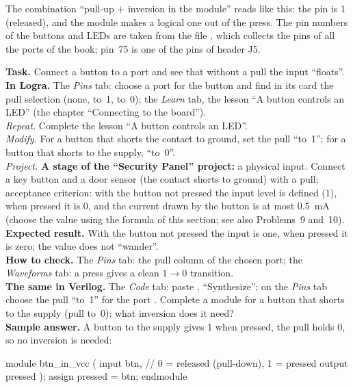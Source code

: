 The combination ``pull-up $+$ inversion in the module'' reads like this: the pin
is 1 (released), and the module makes a logical one out of the press. The pin
numbers of the buttons and LEDs are taken from the file
, which collects the pins of all the ports of
the book; pin~75 is one of the pins of header J5.

\begin{diybox}
\textbf{Task.} Connect a button to a port and see that without a pull
the input ``floats''.\\
\textbf{In Logra.} The \emph{Pins} tab: choose a port for the button and find in
its card the pull selection (none, to~1, to~0); the \emph{Learn} tab, the lesson
``A button controls an LED'' (the chapter ``Connecting to the board'').\\
 \emph{Repeat.} Complete the lesson ``A button controls an LED''.\\
 \emph{Modify.} For a button that shorts the contact to ground, set
the pull ``to~1''; for a button that shorts to the supply, ``to~0''.\\
 \emph{Project.} \textbf{A stage of the ``Security Panel'' project:} a physical
input. Connect a key button and a door sensor (the contact shorts to ground) with
a pull; acceptance criterion: with the button not pressed the input level is
defined (1), when pressed it is 0, and the current drawn by the button is at most
0.5~mA (choose the value using the formula of this section; see also
Problems~9 and~10).\\
\textbf{Expected result.} With the button not pressed the input is one, when
pressed it is zero; the value does not ``wander''.\\
\textbf{How to check.} The \emph{Pins} tab: the pull column of the chosen
port; the \emph{Waveforms} tab: a press gives a clean $1\to0$ transition.\\
\textbf{The same in Verilog.} The \emph{Code} tab: paste ,
``Synthesize''; on the \emph{Pins} tab choose the pull ``to~1'' for the port
.  Complete a module for a button that shorts to the
supply (pull to~0): what inversion does it need?\\
\textbf{Sample answer.} A button to the supply gives 1 when pressed, the pull holds
0, so no inversion is needed:
\end{diybox}

\begin{vcode}
module btn_in_vcc (
    input  btn,                  // 0 = released (pull-down), 1 = pressed
    output pressed
);
    assign pressed = btn;
endmodule
\end{vcode}


